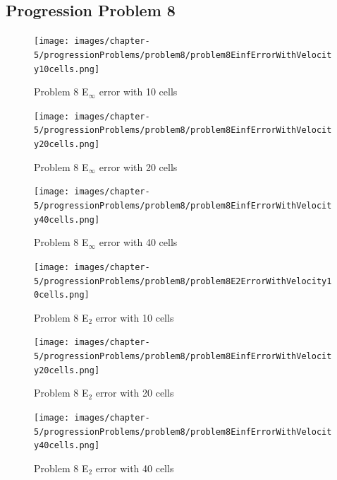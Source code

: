 \clearpage

\subsection{Progression Problem 8}

\begin{figure}[p]
    \centering
    \texttt{[image: images/chapter-5/progressionProblems/problem8/problem8EinfErrorWithVelocity10cells.png]}
    \caption{Problem 8 E${}_{\infty}$ error with 10 cells}
    \label{fig:problem8_Einf_error_10cells}
\end{figure}

\clearpage

\begin{figure}[p]
    \centering
    \texttt{[image: images/chapter-5/progressionProblems/problem8/problem8EinfErrorWithVelocity20cells.png]}
    \caption{Problem 8 E${}_{\infty}$ error with 20 cells}
    \label{fig:problem8_Einf_error_20cells}
\end{figure}

\clearpage

\begin{figure}[p]
    \centering
    \texttt{[image: images/chapter-5/progressionProblems/problem8/problem8EinfErrorWithVelocity40cells.png]}
    \caption{Problem 8 E${}_{\infty}$ error with 40 cells}
    \label{fig:problem8_Einf_error_40cells}
\end{figure}

\begin{figure}[p]
    \centering
    \texttt{[image: images/chapter-5/progressionProblems/problem8/problem8E2ErrorWithVelocity10cells.png]}
    \caption{Problem 8 E${}_{2}$ error with 10 cells}
    \label{fig:problem8_E2_error_10cells}
\end{figure}

\clearpage

\begin{figure}[p]
    \centering
    \texttt{[image: images/chapter-5/progressionProblems/problem8/problem8EinfErrorWithVelocity20cells.png]}
    \caption{Problem 8 E${}_{2}$ error with 20 cells}
    \label{fig:problem8_E2_error_20cells}
\end{figure}

\clearpage

\begin{figure}[p]
    \centering
    \texttt{[image: images/chapter-5/progressionProblems/problem8/problem8EinfErrorWithVelocity40cells.png]}
    \caption{Problem 8 E${}_{2}$ error with 40 cells}
    \label{fig:problem8_E2_error_40cells}
\end{figure}